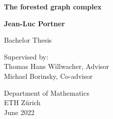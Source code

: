 \begin{titlepage}
   \begin{center}
       \vspace*{4cm}

       \textbf{The forested graph complex}

       \vspace{0.5cm}
            
       \vspace{1.5cm}

       \textbf{Jean-Luc Portner}

	   \vspace{0.8cm}
            
       Bachelor Thesis
       
       \vspace{0.5cm}
       
       Supervised by:\\
	   Thomas Hans Willwacher, Advisor\\
	   Michael Borinsky, Co-advisor
            
       \vfill
     
       Department of Mathematics\\
       ETH Zürich\\
       June 2022
            
   \end{center}
\end{titlepage}
